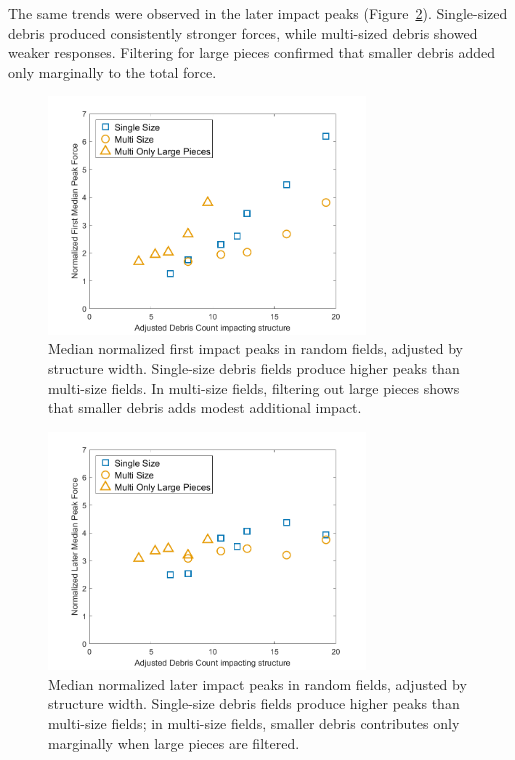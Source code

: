 \documentclass{article}
\begin{document}
The same trends were observed in the later impact peaks (Figure~\ref{fig:random_later_median_adjusted}). Single-sized debris produced consistently stronger forces, while multi-sized debris showed weaker responses. Filtering for large pieces confirmed that smaller debris added only marginally to the total force.

\begin{figure}[htbp]
    \centering
    \includegraphics[width=0.75\textwidth]{First_Peak_Median_Single_vs_Multi_Adjusted.png}
    \caption{Median normalized first impact peaks in random fields, adjusted by structure width. Single-size debris fields produce higher peaks than multi-size fields. In multi-size fields, filtering out large pieces shows that smaller debris adds modest additional impact.}
    \label{fig:random_first_median_adjusted}
\end{figure}

\begin{figure}[htbp]
    \centering
    \includegraphics[width=0.75\textwidth]{Later_Peak_Median_Single_vs_Multi_Adjusted.png}
    \caption{Median normalized later impact peaks in random fields, adjusted by structure width. Single-size debris fields produce higher peaks than multi-size fields; in multi-size fields, smaller debris contributes only marginally when large pieces are filtered.}
    \label{fig:random_later_median_adjusted}
\end{figure}
\end{document}
